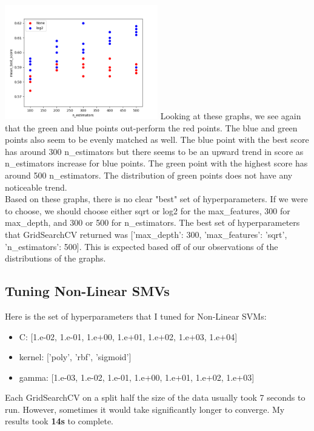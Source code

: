 \documentclass[12pt]{article}
\begin{document}
\includegraphics[width=0.5\textwidth]{RF_n_estimators3.png}
Looking at these graphs, we see again that the green and blue points out-perform the red points. The blue and green points also seem to be evenly matched as well. The blue point with the best score has around 300 n\_estimators but there seems to be an upward trend in score as n\_estimators increase for blue points. The green point with the highest score has around 500 n\_estimators. The distribution of green points does not have any noticeable trend. \\
Based on these graphs, there is no clear "best" set of hyperparameters. If we were to choose, we should choose either sqrt or log2 for the max\_features, 300 for max\_depth, and 300 or 500 for n\_estimators. The best set of hyperparameters that GridSearchCV returned was ['max\_depth': 300, 'max\_features': 'sqrt', 'n\_estimators': 500]. This is expected based off of our observations of the distributions of the graphs.

\subsection{Tuning Non-Linear SMVs}
Here is the set of hyperparameters that I tuned for Non-Linear SVMs:
\begin{itemize}
    \item C: [1.e-02, 1.e-01, 1.e+00, 1.e+01, 1.e+02, 1.e+03, 1.e+04]
    \item kernel: ['poly', 'rbf', 'sigmoid'] 
    \item gamma: [1.e-03, 1.e-02, 1.e-01, 1.e+00, 1.e+01, 1.e+02, 1.e+03]
\end{itemize}
Each GridSearchCV on a split half the size of the data usually took 7 seconds to run. However, sometimes it would take significantly longer to converge. My results took \textbf{14s} to complete.
\end{document}

